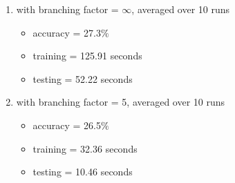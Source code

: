 \documentclass[10pt,letterpaper]{article}
\begin{document}
	\begin{enumerate}	
		\item with branching factor = $\infty$, averaged over 10 runs
		\begin{itemize}
			\item accuracy = 27.3$\%$
			\item training = 125.91 seconds
			\item testing = 52.22 seconds
		\end{itemize}
		\item with branching factor = 5, averaged over 10 runs
		\begin{itemize}
			\item accuracy = 26.5$\%$
			\item training = 32.36 seconds
			\item testing = 10.46 seconds
		\end{itemize}
	\end{enumerate}
		
\end{document}
